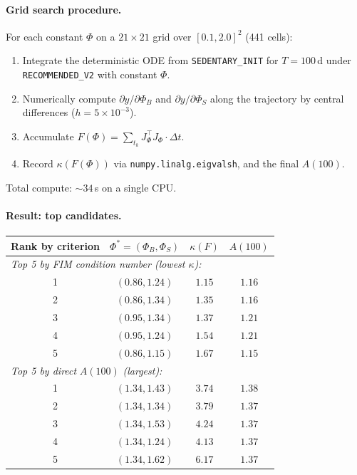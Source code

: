 \documentclass[11pt,a4paper]{article}
\theoremstyle{definition}
\begin{document}
\paragraph{Grid search procedure.} For each constant $\Phi$ on a $21 \times 21$ grid over $[0.1, 2.0]^2$ (441 cells):
\begin{enumerate}
  \item Integrate the deterministic ODE from \texttt{SEDENTARY\_INIT} for $T = 100$\,d under \texttt{RECOMMENDED\_V2} with constant $\Phi$.
  \item Numerically compute $\partial y / \partial \Phi_B$ and $\partial y / \partial \Phi_S$ along the trajectory by central differences ($h = 5 \times 10^{-3}$).
  \item Accumulate $F(\Phi) = \sum_{t_k} J_\Phi^\top J_\Phi \cdot \Delta t$.
  \item Record $\kappa(F(\Phi))$ via \texttt{numpy.linalg.eigvalsh}, and the final $A(100)$.
\end{enumerate}
Total compute: $\sim 34$\,s on a single CPU.

\paragraph{Result: top candidates.}
\begin{center}\small
\begin{tabular}{cccc}
\toprule
Rank by criterion & $\Phi^* = (\Phi_B, \Phi_S)$ & $\kappa(F)$ & $A(100)$ \\
\midrule
\multicolumn{4}{l}{\textit{Top 5 by FIM condition number (lowest $\kappa$):}} \\
1 & $(0.86, 1.24)$ & $1.15$ & $1.16$ \\
2 & $(0.86, 1.34)$ & $1.35$ & $1.16$ \\
3 & $(0.95, 1.34)$ & $1.37$ & $1.21$ \\
4 & $(0.95, 1.24)$ & $1.54$ & $1.21$ \\
5 & $(0.86, 1.15)$ & $1.67$ & $1.15$ \\
\midrule
\multicolumn{4}{l}{\textit{Top 5 by direct} $A(100)$\textit{ (largest):}} \\
1 & $(1.34, 1.43)$ & $3.74$ & $1.38$ \\
2 & $(1.34, 1.34)$ & $3.79$ & $1.37$ \\
3 & $(1.34, 1.53)$ & $4.24$ & $1.37$ \\
4 & $(1.34, 1.24)$ & $4.13$ & $1.37$ \\
5 & $(1.34, 1.62)$ & $6.17$ & $1.37$ \\
\bottomrule
\end{tabular}
\end{center}
\end{document}
